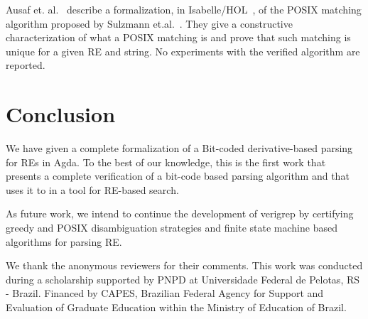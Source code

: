 \documentclass[sigconf]{acmart}
\theoremstyle{definition}
\begin{document}
Ausaf et. al.~\cite{AusafDU16} describe a formalization, in
Isabelle/HOL~\cite{Nipkow02}, of the POSIX matching algorithm proposed
by Sulzmann et.al.~\cite{SulzmannL14}. They give a constructive
characterization of what a POSIX matching is and prove that such
matching is unique for a given RE and string. No experiments with the
verified algorithm are reported.


\section{Conclusion}\label{sec:conclusion}

We have given a complete formalization of a Bit-coded derivative-based 
parsing for REs in Agda. To the best of our knowledge, this is the first work
that presents a complete verification of a bit-code based parsing algorithm 
and that uses it to in a tool for RE-based search.


As future work, we intend to continue the development of verigrep by
certifying greedy and POSIX disambiguation strategies and finite state machine
based algorithms for parsing RE.

\begin{acks}
We thank the anonymous reviewers for their comments. 
This work was conducted during a scholarship supported by PNPD at 
Universidade Federal de Pelotas, RS - Brazil. Financed by CAPES, Brazilian 
Federal Agency for Support and Evaluation of Graduate Education within the 
Ministry of Education of Brazil.
\end{acks}



\end{document}
